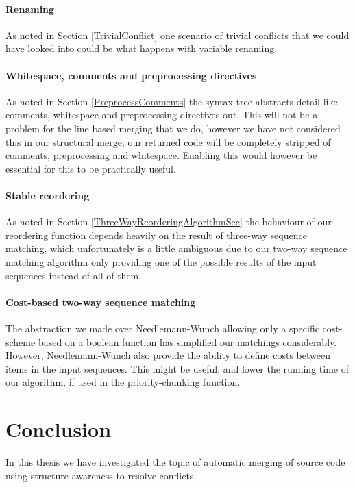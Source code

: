 \documentclass[11pt]{article}
\begin{document}
\paragraph{Renaming} As noted in Section \ref{TrivialConflict} one scenario of trivial conflicts that we could have looked into could be what happens with variable renaming. 

\paragraph{Whitespace, comments and preprocessing directives} As noted in Section \ref{PreprocessComments} the syntax tree abstracts detail like comments, whitespace and preprocessing directives out. This will not be a problem for the line based merging that we do, however we have not considered this in our structural merge; our returned code will be completely stripped of comments, preprocessing and whitespace. Enabling this would however be essential for this to be practically useful.

\paragraph{Stable reordering} As noted in Section \ref{ThreeWayReorderingAlgorithmSec} the behaviour of our reordering function depends heavily on the result of three-way sequence matching, which unfortunately is a little ambiguous due to our two-way sequence matching algorithm only providing one of the possible results of the input sequences instead of all of them.

\paragraph{Cost-based two-way sequence matching} The abstraction we made over Needlemann-Wunch allowing only a specific cost-scheme based on a boolean function has simplified our matchings considerably. However, Needlemann-Wunch also provide the ability to define costs between items in the input sequences. This might be useful, and lower the running time of our algorithm, if used in the priority-chunking function.

\clearpage
\section{Conclusion}
In this thesis we have investigated the topic of automatic merging of source code using structure awareness to resolve conflicts.
\end{document}
